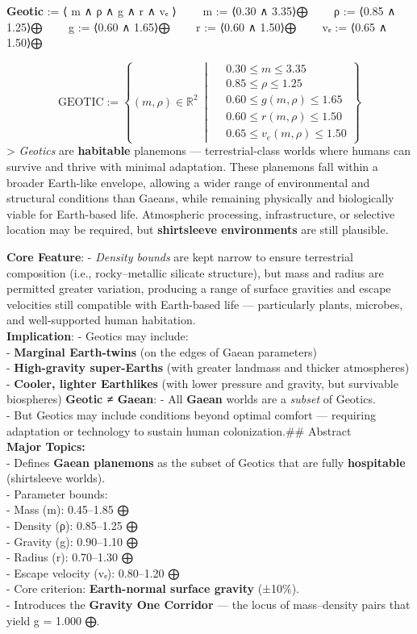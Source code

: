\documentclass[
  letterpaper,
]{book}
\begin{document}
\textbf{Geotic} := ⟨ m ∧ ρ ∧ g ∧ r ∧ vₑ ⟩   m := ⟨0.30 ∧ 3.35⟩⨁   ρ :=
⟨0.85 ∧ 1.25⟩⨁   g := ⟨0.60 ∧ 1.65⟩⨁   r := ⟨0.60 ∧ 1.50⟩⨁   vₑ := ⟨0.65
∧ 1.50⟩⨁

\[\text{GEOTIC} := \left\{ (m, \rho) \in \mathbb{R}^2 \ \middle|\
\begin{aligned}
&0.30 \leq m \leq 3.35 \\
&0.85 \leq \rho \leq 1.25 \\
&0.60 \leq g(m, \rho) \leq 1.65 \\
&0.60 \leq r(m, \rho) \leq 1.50 \\
&0.65 \leq v_e(m, \rho) \leq 1.50
\end{aligned}
\right\}
\] \textgreater{} \emph{Geotics} are \textbf{habitable} planemons ---
terrestrial-class worlds where humans can survive and thrive with
minimal adaptation. These planemons fall within a broader Earth-like
envelope, allowing a wider range of environmental and structural
conditions than Gaeans, while remaining physically and biologically
viable for Earth-based life. Atmospheric processing, infrastructure, or
selective location may be required, but \textbf{shirtsleeve
environments} are still plausible.

\textbf{Core Feature}: - \emph{Density bounds} are kept narrow to ensure
terrestrial composition (i.e., rocky--metallic silicate structure), but
mass and radius are permitted greater variation, producing a range of
surface gravities and escape velocities still compatible with
Earth-based life --- particularly plants, microbes, and well-supported
human habitation.\\
\textbf{Implication}: - Geotics may include:\\
- \textbf{Marginal Earth-twins} (on the edges of Gaean parameters)\\
- \textbf{High-gravity super-Earths} (with greater landmass and thicker
atmospheres)\\
- \textbf{Cooler, lighter Earthlikes} (with lower pressure and gravity,
but survivable biospheres) \textbf{Geotic ≠ Gaean}: - All \textbf{Gaean}
worlds are a \emph{subset} of Geotics.\\
- But Geotics may include conditions beyond optimal comfort ---
requiring adaptation or technology to sustain human colonization.\#\#
Abstract\\
\textbf{Major Topics:}\\
- Defines \textbf{Gaean planemons} as the subset of Geotics that are
fully \textbf{hospitable} (shirtsleeve worlds).\\
- Parameter bounds:\\
- Mass (m): 0.45--1.85 ⨁\\
- Density (ρ): 0.85--1.25 ⨁\\
- Gravity (g): 0.90--1.10 ⨁\\
- Radius (r): 0.70--1.30 ⨁\\
- Escape velocity (vₑ): 0.80--1.20 ⨁\\
- Core criterion: \textbf{Earth-normal surface gravity} (±10\%).\\
- Introduces the \textbf{Gravity One Corridor} --- the locus of
mass--density pairs that yield g = 1.000 ⨁.
\end{document}
